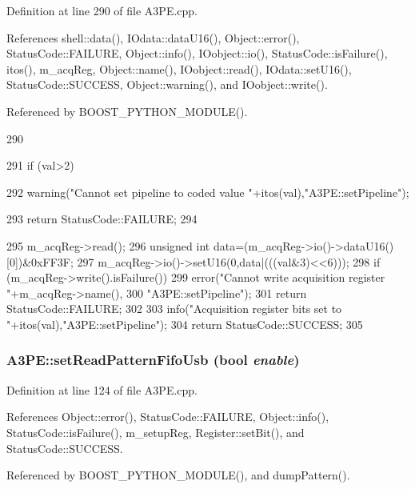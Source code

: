 Definition at line 290 of file A3PE.cpp.

References shell::data(), IOdata::dataU16(), Object::error(), StatusCode::FAILURE, Object::info(), IOobject::io(), StatusCode::isFailure(), itos(), m\_\-acqReg, Object::name(), IOobject::read(), IOdata::setU16(), StatusCode::SUCCESS, Object::warning(), and IOobject::write().

Referenced by BOOST\_\-PYTHON\_\-MODULE().


\begin{DoxyCode}
290                                             {
291   if (val>2) {
292     warning("Cannot set pipeline to coded value "+itos(val),"A3PE::setPipeline");
      
293     return StatusCode::FAILURE;
294   }
295   m_acqReg->read();
296   unsigned int data=(m_acqReg->io()->dataU16()[0])&0xFF3F;
297   m_acqReg->io()->setU16(0,data|(((val&3)<<6)));
298   if (m_acqReg->write().isFailure()){
299     error("Cannot write acquisition register "+m_acqReg->name(),
300       "A3PE::setPipeline");
301     return StatusCode::FAILURE;
302   }
303   info("Acquisition register bits set to "+itos(val),"A3PE::setPipeline");
304   return StatusCode::SUCCESS;
305 }
\end{DoxyCode}
\hypertarget{classA3PE_a9d3ba9807ea65be0af7f23ffa2372d6b}{
\subsubsection[{setReadPatternFifoUsb}]{ A3PE::setReadPatternFifoUsb (bool {\em enable})}}
\label{classA3PE_a9d3ba9807ea65be0af7f23ffa2372d6b}


Definition at line 124 of file A3PE.cpp.

References Object::error(), StatusCode::FAILURE, Object::info(), StatusCode::isFailure(), m\_\-setupReg, Register::setBit(), and StatusCode::SUCCESS.

Referenced by BOOST\_\-PYTHON\_\-MODULE(), and dumpPattern().


